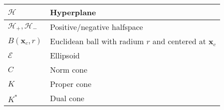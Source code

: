 \documentclass{article}
\begin{document}
\begin{xltabular}{\textwidth}{XX}
	\(\mathcal{H}\)                                                                                                          & Hyperplane                                                                                                                                                                                                     \\ \hline
	\(\mathcal{H}_{+}, \mathcal{H}_{-}\)                                                                                     & Positive/negative halfspace                                                                                                                                                                                    \\ \hline
	\(B(\mathbf{x}_c, r)\)                                                                                                   & Euclidean ball with radium \(r\) and centered at \(\mathbf{x}_c\)                                                                                                                                              \\ \hline
	\(\mathcal{E}\)                                                                                                          & Ellipsoid                                                                                                                                                                                                      \\ \hline
	\(C\)                                                                                                                    & Norm cone                                                                                                                                                                                                      \\ \hline
	\(K\)                                                                                                                    & Proper cone                                                                                                                                                                                                    \\ \hline
	\(K^*\)                                                                                                                  & Dual cone                                                                                                                                                                                                      \\ \hline

\end{xltabular}
\end{document}
